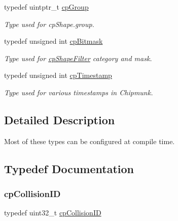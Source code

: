 \begin{DoxyCompactItemize}
\mbox{\label{group__basic_types_gacd811b1135a8f4a3e5cc019552b18b1a}} 
typedef uintptr\+\_\+t \mbox{\hyperlink{group__basic_types_gacd811b1135a8f4a3e5cc019552b18b1a}{cp\+Group}}
\begin{DoxyCompactList}\small\item\em Type used for cp\+Shape.\+group. \end{DoxyCompactList}\item 
\mbox{\label{group__basic_types_gae7ff94f62e00cae288c1991958822743}} 
typedef unsigned int \mbox{\hyperlink{group__basic_types_gae7ff94f62e00cae288c1991958822743}{cp\+Bitmask}}
\begin{DoxyCompactList}\small\item\em Type used for \mbox{\hyperlink{structcp_shape_filter}{cp\+Shape\+Filter}} category and mask. \end{DoxyCompactList}\item 
\mbox{\label{group__basic_types_gaa24652c104082d0725066ea5ac7dc83f}} 
typedef unsigned int \mbox{\hyperlink{group__basic_types_gaa24652c104082d0725066ea5ac7dc83f}{cp\+Timestamp}}
\begin{DoxyCompactList}\small\item\em Type used for various timestamps in Chipmunk. \end{DoxyCompactList}\end{DoxyCompactItemize}


\subsection{Detailed Description}
Most of these types can be configured at compile time. 

\subsection{Typedef Documentation}
\mbox{\label{group__basic_types_ga89d4043ca0567e947aaca19cf9600df5}} 
\subsubsection{\texorpdfstring{cp\+Collision\+ID}{cpCollisionID}}
{\footnotesize\ttfamily typedef uint32\+\_\+t \mbox{\hyperlink{group__basic_types_ga89d4043ca0567e947aaca19cf9600df5}{cp\+Collision\+ID}}}

